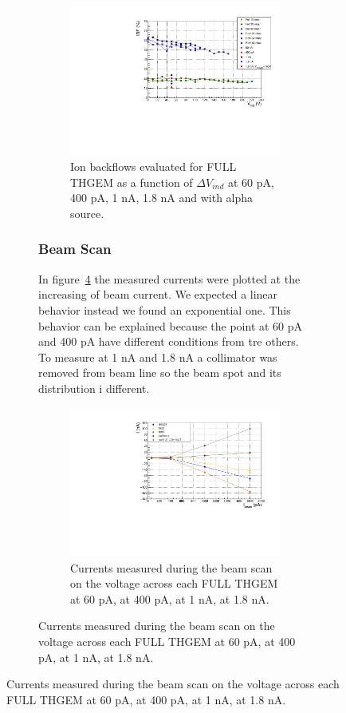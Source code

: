 \documentclass[a4paper, 11 pt]{article}
\newcommand{\Vind}{$\Delta V_{ind}$}
\begin{document}
\begin{figure}[htbp]
\begin{figure}[htbp]
\begin{figure}[htbp]
	\centering
	\includegraphics[width=\textwidth]{Immagini/IBFvsInd_beam.pdf}
	\caption{Ion backflows evaluated for FULL THGEM as a function of \Vind{} at 60 pA, 400 pA, 1 nA, 1.8 nA and with alpha source.}
	\label{fig:IBFvsInd_beam.pdf}
\end{figure}


\subsubsection{Beam Scan}

In figure~\ref{fig:IbeamScan_THGEM10_10mbar_average} the measured currents were plotted at the increasing of beam current. We expected a linear behavior instead we found an exponential one. This behavior can be explained because the point at 60 pA and 400 pA have different conditions from tre others. To measure at 1 nA and 1.8 nA a collimator was removed from beam line so the beam spot and its distribution i different.

\begin{figure}[htbp]
	\centering
	\includegraphics[width=\textwidth]{Immagini/IbeamScan_THGEM10_10mbar_average.pdf}
	\caption{Currents measured during the beam scan on the voltage across each FULL THGEM at 60 pA, at 400 pA, at 1 nA, at 1.8 nA.}
	\label{fig:IbeamScan_THGEM10_10mbar_average}
\end{figure}


\end{figure}
\end{figure}
\end{document}
